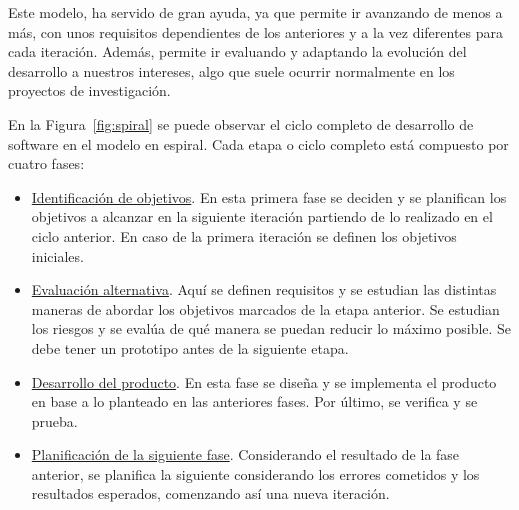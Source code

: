 Este modelo, ha servido de gran ayuda, ya que permite ir avanzando de menos a más, con unos requisitos dependientes de los anteriores y a la vez diferentes para cada iteración. Además, permite ir evaluando y adaptando la evolución del desarrollo a nuestros intereses, algo que suele ocurrir normalmente en los proyectos de investigación.

En la Figura~\ref{fig:spiral} se puede observar el ciclo completo de desarrollo de software en el modelo en espiral. Cada etapa o ciclo completo está compuesto por cuatro fases:

\begin{itemize}
\item \underline{Identificación de objetivos}. En esta primera fase se deciden y se planifican los objetivos a alcanzar en la siguiente iteración partiendo de lo realizado en el ciclo anterior. En caso de la primera iteración se definen los objetivos iniciales.

\item \underline{Evaluación alternativa}. Aquí se definen requisitos y se estudian las distintas maneras de abordar los objetivos marcados de la etapa anterior. Se estudian los riesgos y se evalúa de qué manera se puedan reducir lo máximo posible. Se debe tener un prototipo antes de la siguiente etapa.

\item \underline{Desarrollo del producto}. En esta fase se diseña y se implementa el producto en base a lo planteado en las anteriores fases. Por último, se verifica y se prueba.

\item \underline{Planificación de la siguiente fase}. Considerando el resultado de la fase anterior, se planifica la siguiente considerando los errores cometidos y los resultados esperados, comenzando así una nueva iteración.

\end{itemize}

